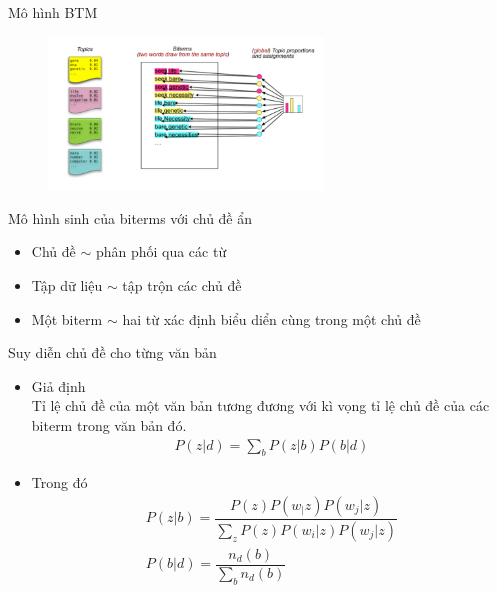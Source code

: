\documentclass[pdf]{beamer}
\begin{document}
\begin{frame}{Mô hình BTM}
	\begin{figure}
		\includegraphics[width=0.65\textwidth]{06.png}
	\end{figure}				
	Mô hình sinh của biterms với chủ đề ẩn
	\begin{itemize}
		\item Chủ đề $\sim$ phân phối qua các từ 
		\item Tập dữ liệu $\sim$ tập trộn các chủ đề
		\item Một biterm $\sim$ hai từ xác định biểu diển cùng trong một chủ đề
	\end{itemize}
\end{frame}
\begin{frame}{Suy diễn chủ đề cho từng văn bản}
\begin{itemize}
	\item Giả định \\
	Tỉ lệ chủ đề của một văn bản tương đương với kì vọng tỉ lệ chủ đề của các biterm trong văn bản đó.\\

	\begin{align*}
		P(z|d) = \sum_b P(z|b)P(b|d)
	\end{align*}
	\item Trong đó 
	\begin{align*}
		P(z|b) = \dfrac{P(z)P(w_|z)P(w_j|z)}{\sum_zP(z)P(w_i|z)P(w_j|z)}\\
		P(b|d) = \dfrac{n_d(b)}{\sum_bn_d(b)}
	\end{align*}
\end{itemize}
\end{frame}
\end{document}
